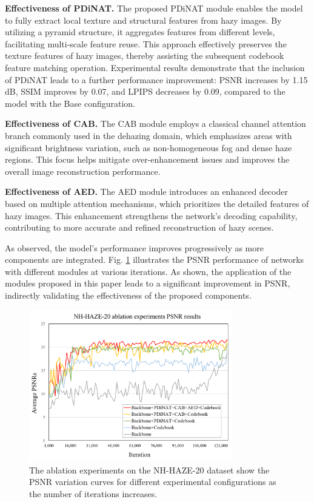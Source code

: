 \documentclass[journal]{IEEEtran}
\begin{document}
	{\bf{Effectiveness of PDiNAT.}} The proposed PDiNAT module enables the model to fully extract local texture and structural features from hazy images. By utilizing a pyramid structure, it aggregates features from different levels, facilitating multi-scale feature reuse. This approach effectively preserves the texture features of hazy images, thereby assisting the subsequent codebook feature matching operation. Experimental results demonstrate that the inclusion of PDiNAT leads to a further performance improvement: PSNR increases by 1.15 dB, SSIM improves by 0.07, and LPIPS decreases by 0.09, compared to the model with the Base configuration.

	{\bf{Effectiveness of CAB.}} The CAB module employs a classical channel attention branch commonly used in the dehazing domain, which emphasizes areas with significant brightness variation, such as non-homogeneous fog and dense haze regions. This focus helps mitigate over-enhancement issues and improves the overall image reconstruction performance.

	{\bf{Effectiveness of AED.}} The AED module introduces an enhanced decoder based on multiple attention mechanisms, which prioritizes the detailed features of hazy images. This enhancement strengthens the network’s decoding capability, contributing to more accurate and refined reconstruction of hazy scenes.

As observed, the model's performance improves progressively as more components are integrated. Fig. \ref{Ablation_study_2} illustrates the PSNR performance of networks with different modules at various iterations. As shown, the application of the modules proposed in this paper leads to a significant improvement in PSNR, indirectly validating the effectiveness of the proposed components.

\begin{figure}[!t]
	\centering
	\includegraphics[width=3.49in]{ablation_experiments}
	\caption{The ablation experiments on the NH-HAZE-20 dataset show the PSNR variation curves for different experimental configurations as the number of iterations increases.}
	\label{Ablation_study_2}
\end{figure}
\end{document}
